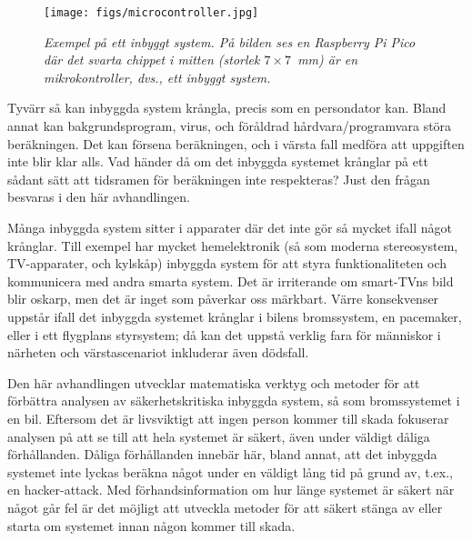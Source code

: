 \documentclass[svenska]{style/LTHthesis}
\begin{document}
\begin{figure}
    \vspace*{-2mm}
    \begin{centering}
        \texttt{[image: figs/microcontroller.jpg]}
    \end{centering}\small\par\medskip
        \noindent\emph{Exempel på ett inbyggt system. På bilden ses en Raspberry Pi Pico där det svarta chippet i mitten (storlek $7\times 7$~mm) är en mikrokontroller, dvs., ett inbyggt system.}\footnotemark
    \vspace*{-2mm}
\end{figure}

Tyvärr så kan inbyggda system krångla, precis som en persondator kan.
Bland annat kan bakgrundsprogram, virus, och föråldrad hårdvara/programvara störa beräkningen.
Det kan försena beräkningen, och i värsta fall medföra att uppgiften inte blir klar alls.
Vad händer då om det inbyggda systemet krånglar på ett sådant sätt att tidsramen för beräkningen inte respekteras?
Just den frågan besvaras i den här avhandlingen.

Många inbyggda system sitter i apparater där det inte gör så mycket ifall något krånglar.
Till exempel har mycket hemelektronik (så som moderna stereosystem, TV-apparater, och kylskåp) inbyggda system för att styra funktionaliteten och kommunicera med andra smarta system.
Det är irriterande om smart-TVns bild blir oskarp, men det är inget som påverkar oss märkbart.
Värre konsekvenser uppstår ifall det inbyggda systemet krånglar i bilens bromssystem, en pacemaker, eller i ett flygplans styrsystem; då kan det uppstå verklig fara för människor i närheten och värstascenariot inkluderar även dödsfall.

Den här avhandlingen utvecklar matematiska verktyg och metoder för att förbättra analysen av säkerhetskritiska inbyggda system, så som bromssystemet i en bil.
Eftersom det är livsviktigt att ingen person kommer till skada fokuserar analysen på att se till att hela systemet är säkert, även under väldigt dåliga förhållanden.
Dåliga förhållanden innebär här, bland annat, att det inbyggda systemet inte lyckas beräkna något under en väldigt lång tid på grund av, t.ex., en hacker-attack.
Med förhandsinformation om hur länge systemet är säkert när något går fel är det möjligt att utveckla metoder för att säkert stänga av eller starta om systemet innan någon kommer till skada.
\end{document}
